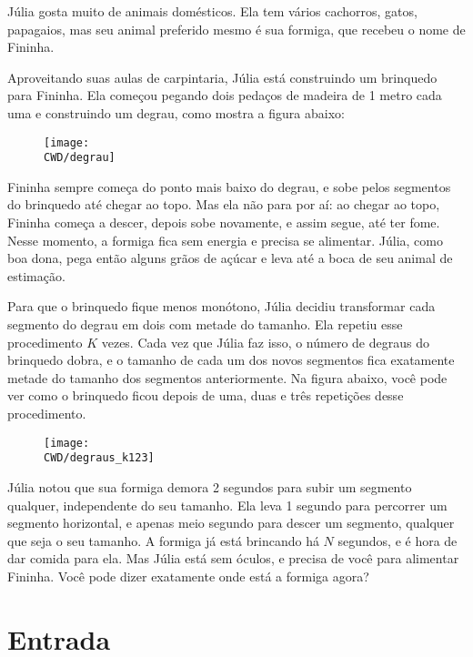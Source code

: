 Júlia gosta muito de animais domésticos. Ela tem vários cachorros, gatos, papagaios, mas seu animal preferido mesmo é sua formiga, que recebeu o nome de Fininha.

Aproveitando suas aulas de carpintaria, Júlia está construindo um brinquedo para Fininha.
Ela começou pegando dois pedaços de madeira de 1 metro cada uma e construindo um degrau,
como mostra a figura abaixo:

\begin{figure}[h]
\begin{center}
  \texttt{[image: \\CWD/degrau]}
\end{center}
\end{figure}

Fininha sempre começa do ponto mais baixo do degrau, e sobe pelos segmentos do brinquedo até chegar ao topo. Mas ela não para por aí: ao chegar ao topo, Fininha começa a descer, depois sobe novamente, e assim segue, até ter fome. Nesse momento, a formiga fica sem energia e precisa se alimentar. Júlia, como boa dona, pega então alguns grãos de açúcar e leva até a boca de seu animal de estimação.

Para que o brinquedo fique menos monótono, Júlia decidiu transformar cada segmento do degrau em dois com metade do tamanho. Ela repetiu esse procedimento $K$ vezes. Cada vez que Júlia faz isso, o número de degraus do brinquedo dobra, e o tamanho de cada um dos novos segmentos fica exatamente metade do tamanho dos segmentos anteriormente. Na figura abaixo, você pode ver como o brinquedo ficou depois de uma, duas e três repetições desse procedimento.

\begin{figure}[h]
\begin{center}
  \texttt{[image: \\CWD/degraus\_k123]}
\end{center}
\end{figure}

Júlia notou que sua formiga demora 2 segundos para subir um segmento qualquer, independente do seu tamanho. Ela leva 1 segundo para percorrer um segmento horizontal, e apenas meio segundo para descer um segmento, qualquer que seja o seu tamanho. A formiga já está brincando há $N$ segundos, e é hora de dar comida para ela. Mas Júlia está sem óculos, e precisa de você para alimentar Fininha. Você pode dizer exatamente onde está a formiga agora?

\section*{Entrada}

